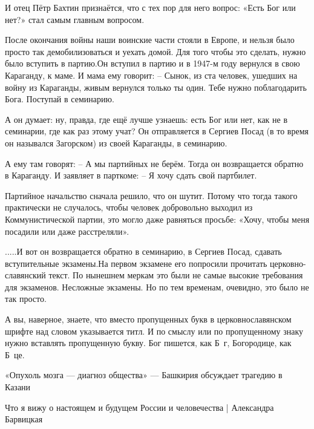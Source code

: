 И отец Пётр Бахтин признаётся, что с тех пор для него вопрос: «Есть Бог или нет?» стал самым главным вопросом.

После окончания войны наши воинские части стояли в Европе, и нельзя было просто так демобилизоваться и уехать домой. Для того чтобы это сделать, нужно было вступить в партию.Он вступил в партию и в 1947-м году вернулся в свою Караганду, к маме.
И мама ему говорит:
– Сынок, из ста человек, ушедших на войну из Караганды, живым вернулся только ты один. Тебе нужно поблагодарить Бога. Поступай в семинарию.

А он думает: ну, правда, где ещё лучше узнаешь: есть Бог или нет, как не в семинарии, где как раз этому учат?
Он отправляется в Сергиев Посад (в то время он назывался Загорском) из своей Караганды, в семинарию.

А ему там говорят:
– А мы партийных не берём.
Тогда он возвращается обратно в Караганду. И заявляет в парткоме:
– Я хочу сдать свой партбилет.

Партийное начальство сначала решило, что он шутит. Потому что тогда такого практически не случалось, чтобы человек добровольно выходил из Коммунистической партии, это могло даже равняться просьбе: «Хочу, чтобы меня посадили или даже расстреляли».

.....И вот он возвращается обратно в семинарию, в Сергиев Посад, сдавать вступительные экзамены.На первом экзамене его попросили прочитать церковно-славянский текст. По нынешнем меркам это были не самые высокие требования для экзаменов. Несложные экзамены. Но по тем временам, очевидно, это было не так просто.

А вы, наверное, знаете, что вместо пропущенных букв в церковнославянском шрифте над словом указывается титл. И по смыслу или по пропущенному знаку нужно вставлять пропущенную букву. Бог пишется, как Б~г, Богородице, как Б~це.

«Опухоль мозга — диагноз общества» — Башкирия обсуждает трагедию в Казани 

Что я вижу о настоящем и будущем России и человечества | Александра Барвицкая

